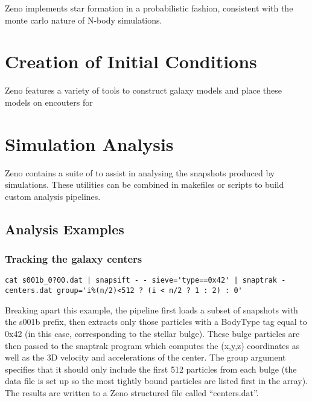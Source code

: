 \documentclass[11pt,letterpaper]{article}
\begin{document}
Zeno implements star formation in a probabilistic fashion, consistent with the monte carlo nature of N-body simulations. 

\section{Creation of Initial Conditions}
\label{sec:IC}

Zeno features a variety of tools to construct galaxy models and place these models on encouters for 

\section{Simulation Analysis}
\label{sec:Analysis}

Zeno contains a suite of to assist in analysing the snapshots produced by simulations. These utilities can be combined in makefiles or scripts to build custom analysis pipelines.

\subsection{Analysis Examples}

\subsubsection{Tracking the galaxy centers}

\begin{verbatim}
cat s001b_0?00.dat | snapsift - - sieve='type==0x42' | snaptrak - centers.dat group='i%(n/2)<512 ? (i < n/2 ? 1 : 2) : 0'
\end{verbatim}

Breaking apart this example, the pipeline first loads a subset of snapshots with the s001b prefix, then extracts only those particles with a BodyType tag equal to 0x42 (in this case, corresponding to the stellar bulge). These bulge particles are then passed to the snaptrak program which computes the (x,y,z) coordinates as well as the 3D velocity and accelerations of the center. The group argument specifies that it should only include the first 512 particles from each bulge (the data file is set up so the most tightly bound particles are listed first in the array). The results are written to a Zeno structured file called ``centers.dat''.
\end{document}
